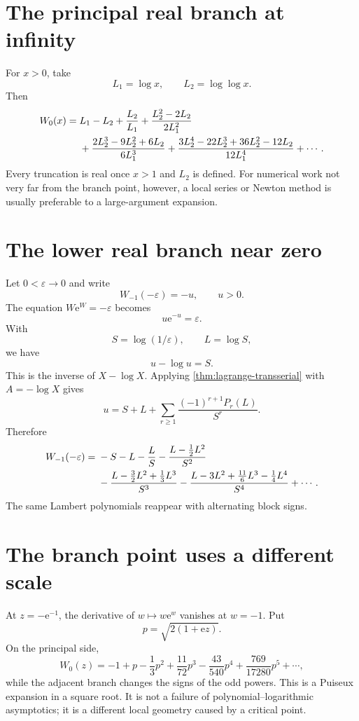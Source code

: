 \documentclass[11pt,oneside]{book}
\theoremstyle{definition}
\theoremstyle{remark}
\newcommand{\e}{\mathrm e}
\newcommand{\eps}{\varepsilon}
\begin{document}
\section{The principal real branch at infinity}
For $x>0$, take
\[
 L_1=\log x,
 \qquad
 L_2=\log\log x.
\]
Then
\begin{align}\label{eq:W0-real-expansion}
 W_0(x)={}&L_1-L_2+\frac{L_2}{L_1}
 +\frac{L_2^2-2L_2}{2L_1^2}\\
 &+\frac{2L_2^3-9L_2^2+6L_2}{6L_1^3}
 +\frac{3L_2^4-22L_2^3+36L_2^2-12L_2}{12L_1^4}
 +\cdots.\notag
\end{align}
Every truncation is real once $x>1$ and $L_2$ is defined.  For numerical work
not very far from the branch point, however, a local series or Newton method
is usually preferable to a large-argument expansion.

\section{The lower real branch near zero}
Let $0<\eps\to0$ and write
\[
 W_{-1}(-\eps)=-u,
 \qquad u>0.
\]
The equation $W\e^W=-\eps$ becomes
\[
 u\e^{-u}=\eps.
\]
With
\[
 S=\log(1/\eps),
 \qquad L=\log S,
\]
we have
\begin{equation}\label{eq:lower-branch-inverse}
 u-\log u=S.
\end{equation}
This is the inverse of $X-\log X$.  Applying
\cref{thm:lagrange-transserial} with $A=-\log X$ gives
\begin{equation}\label{eq:u-lower-branch}
 u=S+L+\sum_{r\ge1}
 \frac{(-1)^{r+1}P_r(L)}{S^r}.
\end{equation}
Therefore
\begin{align}\label{eq:Wminus1-expansion}
 W_{-1}(-\eps)={}&-S-L-\frac{L}{S}
 -\frac{L-\frac12L^2}{S^2}\\
 &-\frac{L-\frac32L^2+\frac13L^3}{S^3}
 -\frac{L-3L^2+\frac{11}{6}L^3-\frac14L^4}{S^4}
 +\cdots.\notag
\end{align}
The same Lambert polynomials reappear with alternating block signs.

\section{The branch point uses a different scale}
At $z=-\e^{-1}$, the derivative of $w\mapsto w\e^w$ vanishes at $w=-1$.
Put
\[
 p=\sqrt{2(1+\e z)}.
\]
On the principal side,
\begin{equation}\label{eq:W-branchpoint}
 W_0(z)=-1+p-\frac13p^2+\frac{11}{72}p^3
 -\frac{43}{540}p^4+\frac{769}{17280}p^5+\cdots,
\end{equation}
while the adjacent branch changes the signs of the odd powers.  This is a
Puiseux expansion in a square root.  It is not a failure of
polynomial--logarithmic asymptotics; it is a different local geometry caused
by a critical point.
\end{document}
